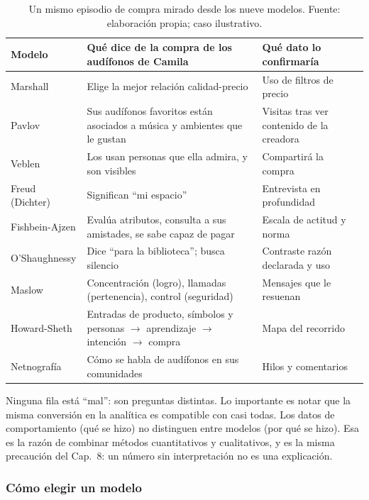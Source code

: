 \begin{table}[!htb]
\centering
\footnotesize
\begin{tabular}{@{}>{\raggedright}p{2.4cm}>{\raggedright}p{5.0cm}>{\raggedright\arraybackslash}p{4.4cm}@{}}
\toprule
Modelo & Qué dice de la compra de los audífonos de Camila & Qué dato lo confirmaría \\
\midrule
Marshall & Elige la mejor relación calidad-precio & Uso de filtros de precio \\
Pavlov & Sus audífonos favoritos están asociados a música y ambientes que le gustan & Visitas tras ver contenido de la creadora \\
Veblen & Los usan personas que ella admira, y son visibles & Compartirá la compra \\
Freud (Dichter) & Significan \enquote{mi espacio} & Entrevista en profundidad \\
Fishbein-Ajzen & Evalúa atributos, consulta a sus amistades, se sabe capaz de pagar & Escala de actitud y norma \\
O'Shaughnessy & Dice \enquote{para la biblioteca}; busca silencio & Contraste razón declarada y uso \\
Maslow & Concentración (logro), llamadas (pertenencia), control (seguridad) & Mensajes que le resuenan \\
Howard-Sheth & Entradas de producto, símbolos y personas $\rightarrow$ aprendizaje $\rightarrow$ intención $\rightarrow$ compra & Mapa del recorrido \\
Netnografía & Cómo se habla de audífonos en sus comunidades & Hilos y comentarios \\
\bottomrule
\end{tabular}
\caption{Un mismo episodio de compra mirado desde los nueve modelos. Fuente:
elaboración propia; caso ilustrativo.}
\label{tab:cap09-lentes}
\end{table}

Ninguna fila está \enquote{mal}: son preguntas distintas. Lo importante es notar
que la misma conversión en la analítica es compatible con casi todas. Los datos
de comportamiento (qué se hizo) no distinguen entre modelos (por qué se hizo).
Esa es la razón de combinar métodos cuantitativos y cualitativos, y es la
misma precaución del Cap.~8: un número sin interpretación no es una
explicación.

\subsubsection{Cómo elegir un modelo}


